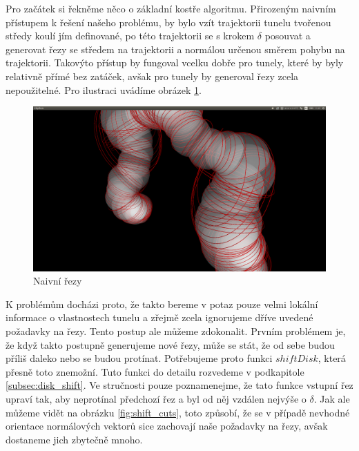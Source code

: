 Pro začátek si řekněme něco o základní kostře algoritmu. Přirozeným naivním přístupem
k řešení našeho problému, by bylo vzít trajektorii tunelu tvořenou středy koulí
jím definované, po této trajektorii se s krokem $ \delta $ posouvat a generovat
řezy se středem na trajektorii a normálou určenou směrem pohybu na trajektorii.
Takovýto přístup by fungoval vcelku dobře pro tunely, které by byly relativně
přímé bez zatáček, avšak pro  tunely by generoval řezy zcela nepoužitelné.
Pro ilustraci uvádíme obrázek \ref{fig:naive_cuts}.

\begin{figure}
    \centering
    \includegraphics[width=\textwidth]{img/naive_cuts.png}
    \caption{Naivní řezy}
  \centering
  \label{fig:naive_cuts}
\end{figure}

K problémům docházi proto, že takto bereme v potaz pouze velmi lokální informace o vlastnostech
tunelu a zřejmě zcela ignorujeme dříve uvedené požadavky na řezy. Tento postup ale
můžeme zdokonalit. Prvním problémem je, že když takto postupně generujeme nové řezy,
může se stát, že od sebe budou příliš daleko nebo se budou protínat. Potřebujeme proto
funkci $ shiftDisk $, která přesně toto znemožní. Tuto funkci do detailu rozvedeme v
podkapitole \ref{subsec:disk_shift}. Ve stručnosti pouze poznamenejme, že tato funkce
vstupní řez upraví tak, aby neprotínal předchozí řez a byl od něj vzdálen nejvýše
o $ \delta $. Jak ale můžeme vidět na obrázku \ref{fig:shift_cuts}, toto způsobí,
že se v případě nevhodné orientace normálových vektorů sice zachovají naše
požadavky na řezy, avšak dostaneme jich zbytečně mnoho.

